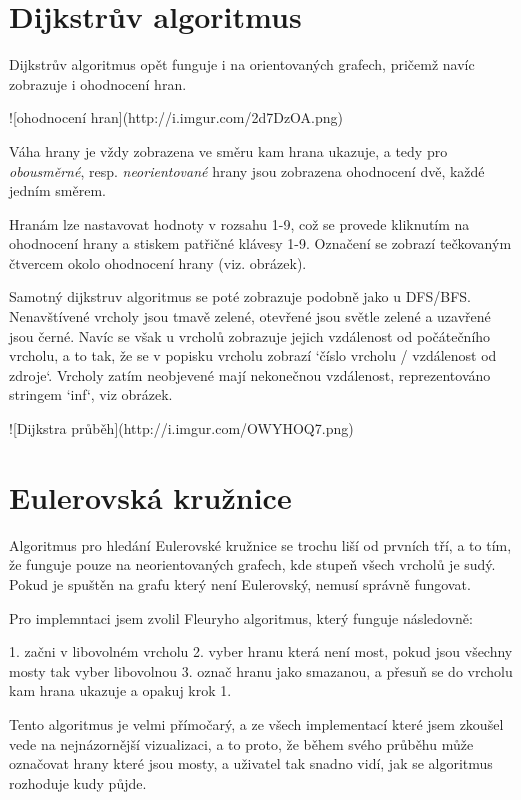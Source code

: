 \documentclass{article}
\begin{document}
\section{Dijkstrův algoritmus}

Dijkstrův algoritmus opět funguje i na orientovaných grafech, pričemž
navíc zobrazuje i ohodnocení hran.

![ohodnocení hran](http://i.imgur.com/2d7DzOA.png)

Váha hrany je vždy zobrazena ve směru kam hrana ukazuje, a tedy pro
\emph{obousměrné}, resp. \emph{neorientované} hrany jsou zobrazena ohodnocení dvě,
každé jedním směrem.

Hranám lze nastavovat hodnoty v rozsahu 1-9, což se provede kliknutím na
ohodnocení hrany a stiskem patřičné klávesy 1-9. Označení se zobrazí
tečkovaným čtvercem okolo ohodnocení hrany (viz. obrázek).

Samotný dijkstruv algoritmus se poté zobrazuje podobně jako u DFS/BFS.
Nenavštívené vrcholy jsou tmavě zelené, otevřené jsou světle zelené a
uzavřené jsou černé. Navíc se však u vrcholů zobrazuje jejich vzdálenost
od počátečního vrcholu, a to tak, že se v popisku vrcholu zobrazí `číslo
vrcholu / vzdálenost od zdroje`. Vrcholy zatím neobjevené mají
nekonečnou vzdálenost, reprezentováno stringem `inf`, viz obrázek.

![Dijkstra průběh](http://i.imgur.com/OWYHOQ7.png)

\section{Eulerovská kružnice}

Algoritmus pro hledání Eulerovské kružnice se trochu liší od prvních
tří, a to tím, že funguje pouze na neorientovaných grafech, kde stupeň
všech vrcholů je sudý. Pokud je spuštěn na grafu který není Eulerovský,
nemusí správně fungovat.

Pro implemntaci jsem zvolil Fleuryho algoritmus, který funguje následovně:

1. začni v libovolném vrcholu
2. vyber hranu která není most, pokud jsou všechny mosty tak vyber libovolnou
3. označ hranu jako smazanou, a přesuň se do vrcholu kam hrana ukazuje a opakuj krok 1.

Tento algoritmus je velmi přímočarý, a ze všech implementací které jsem
zkoušel vede na nejnázornější vizualizaci, a to proto, že během svého
průběhu může označovat hrany které jsou mosty, a uživatel tak snadno
vidí, jak se algoritmus rozhoduje kudy půjde.
\end{document}

